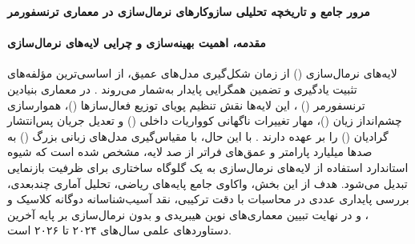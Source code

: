 \item \textbf{مرور جامع و تاریخچه تحلیلی سازوکارهای نرمال‌سازی در معماری ترنسفورمر}

\paragraph*{مقدمه، اهمیت بهینه‌سازی و چرایی لایه‌های نرمال‌سازی}
لایه‌های نرمال‌سازی () از زمان شکل‌گیری مدل‌های عمیق، از اساسی‌ترین مؤلفه‌های تثبیت یادگیری و تضمین همگرایی پایدار به‌شمار می‌روند \cite{ioffe2015batch, ba2016layer}. در معماری بنیادین ترنسفورمر () \cite{vaswani2017attention}، این لایه‌ها نقش تنظیم پویای توزیع فعال‌سازها ()، هموارسازی چشم‌انداز زیان ()، مهار تغییرات ناگهانی کوواریات داخلی () و تعدیل جریان پس‌انتشار گرادیان () را بر عهده دارند \cite{santurkar2018batch}. با این حال، با مقیاس‌گیری مدل‌های زبانی بزرگ () به صدها میلیارد پارامتر و عمق‌های فراتر از صد لایه، مشخص شده است که شیوه استاندارد استفاده از لایه‌های نرمال‌سازی به یک گلوگاه ساختاری برای ظرفیت بازنمایی تبدیل می‌شود. هدف از این بخش، واکاوی جامع پایه‌های ریاضی، تحلیل آماری چندبعدی، بررسی پایداری عددی در محاسبات با دقت ترکیبی، نقد آسیب‌شناسانه دوگانه کلاسیک  و ، و در نهایت تبیین معماری‌های نوین هیبریدی و بدون نرمال‌سازی بر پایه آخرین دستاوردهای علمی سال‌های ۲۰۲۴ تا ۲۰۲۶ است.

